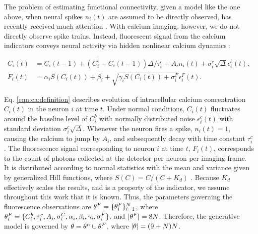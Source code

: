 
The problem of estimating functional connectivity, given a model like the one above, when neural spikes $n_i(t)$ are assumed to be directly observed, has recently received much attention \cite{PILL07}. With calcium imaging, however, we do not directly observe spike trains. Instead, fluorescent signal from the calcium indicators conveys neural activity via hidden nonlinear calcium dynamics \cite{Vogelstein2009}: 

\begin{align} \label{eqn:ca:definition} %
C_i(t) &= C_i(t-1) + (C_i^b-C_i(t-1)) \Delta/\tau^c_i + A_i n_i(t)+\sigma^c_i \sqrt{\Delta} \epsilon^c_i(t), \\
F_i(t) &= \alpha_i S(C_i(t)) + \beta_i + \sqrt{\gamma_i S(C_i(t)) + \sigma^F_i} \epsilon^F_i(t). \label{eqn:F:definition}
\end{align}

Eq. \eqref{eqn:ca:definition} describes evolution of intracellular calcium concentration $C_i(t)$ in the neuron $i$ at time $t$. Under normal conditions, $C_i(t)$ fluctuates around the baseline level of $C_i^b$ with normally distributed noise $\epsilon^c_i(t)$ with standard deviation $\sigma^c_i \sqrt{\Delta}$.  Whenever the neuron fires a spike, $n_i(t)=1$, causing the calcium to jump by $A_i$, and subsequently decay with time constant $\tau^c_i$.  The fluorescence signal corresponding to neuron $i$ at time $t$, $F_i(t)$, corresponds to the count of photons collected at the detector per neuron per imaging frame. It is distributed according to normal statistics with the mean and variance given by generalized Hill functions, where $S(C)=C/(C+K_d)$ \cite{Yasuda2004}.  Because $K_d$ effectively scales the results, and is a property of the indicator, we assume throughout this work that it is known.  Thus, the parameters governing the fluorescence observations are $\mathbf{\theta}^F=\{\mathbf{\theta}^F_i\}_{i=1}^N$, where $\mathbf{\theta}^F_i=\{C^b_i, \tau^c_i, A_i, \sigma^C_i, \alpha_i, \beta_i, \gamma_i, \sigma^F_i\}$, and $|\mathbf{\theta}^F|=8N$.  Therefore, the generative model is governed by $\mathbf{\theta}=\mathbf{\theta}^n \cup \mathbf{\theta}^F$, where $|\mathbf{\theta}|=(9+N)N$. 


